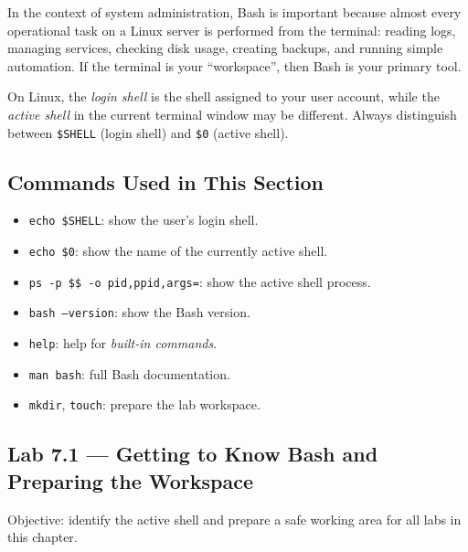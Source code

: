 In the context of system administration, Bash is important because almost
every operational task on a Linux server is performed from the terminal:
reading logs, managing services, checking disk usage, creating backups, and
running simple automation. If the terminal is your ``workspace'', then Bash
is your primary tool.

\begin{tipbox}
On Linux, the \textit{login shell} is the shell assigned to your user account,
while the \textit{active shell} in the current terminal window may be
different. Always distinguish between \texttt{\$SHELL} (login shell) and
\texttt{\$0} (active shell).
\end{tipbox}

\subsection*{Commands Used in This Section}

\begin{itemize}
  \item \texttt{echo \$SHELL}: show the user's login shell.
  \item \texttt{echo \$0}: show the name of the currently active shell.
  \item \texttt{ps -p \$\$ -o pid,ppid,args=}: show the active shell process.
  \item \texttt{bash --version}: show the Bash version.
  \item \texttt{help}: help for \textit{built-in commands}.
  \item \texttt{man bash}: full Bash documentation.
  \item \texttt{mkdir}, \texttt{touch}: prepare the lab workspace.
\end{itemize}

\subsection*{Lab 7.1 --- Getting to Know Bash and Preparing the Workspace}

Objective: identify the active shell and prepare a safe working area for all
labs in this chapter.

